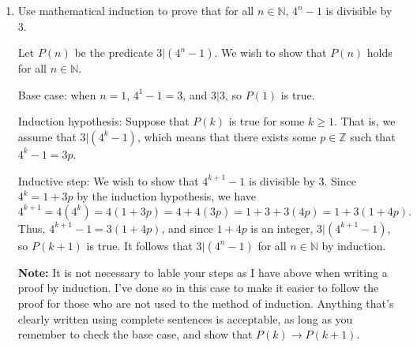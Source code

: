 \documentclass[12pt]{article}
\newcommand{\points}[1]{\marginpar{\hspace{24pt}[#1]}}
\newcommand{\Z}{\mathbb{Z}}
\newcommand{\N}{\mathbb{N}}
\begin{document}
\thispagestyle{fancy}

\bigskip


 \begin{enumerate}
 \item Use mathematical induction to prove that for all $n\in\N$, $4^n-1$ is divisible by $3$. \points{10}

\bigskip

Let $P(n)$ be the predicate $3|(4^n-1)$. We wish to show that $P(n)$ holds for all $n\in\N$.

Base case: when $n=1$, $4^1-1 = 3$, and $3|3$, so $P(1)$ is true.

\medskip

Induction hypothesis: Suppose that $P(k)$ is true for some $k\geq 1$. That is, we assume that $3|(4^k-1)$, which means that there exists some $p\in\Z$ such that $4^k-1 = 3p$.

\medskip

Inductive step: We wish to show that $4^{k+1}-1$ is divisible by 3. Since $4^k=1+3p$ by the induction hypothesis, we have
\[
 4^{k+1} = 4(4^k) = 4(1+3p) = 4+4(3p) = 1+3+3(4p) = 1+3(1+4p).
\]
Thus, $4^{k+1}-1=3(1+4p)$, and since $1+4p$ is an integer, $3|(4^{k+1}-1)$, so $P(k+1)$ is true. It follows that $3|(4^n-1)$ for all $n\in \N$ by induction.

\bigskip

{\bf Note:} It is not necessary to lable your steps as I have above when writing a proof by induction. I've done so in this case to make it easier to follow the proof for those who are not used to the method of induction. Anything that's clearly written using complete sentences is acceptable, as long as you remember to check the base case, and show that $P(k)\to P(k+1)$.
 \end{enumerate}
\end{document}

